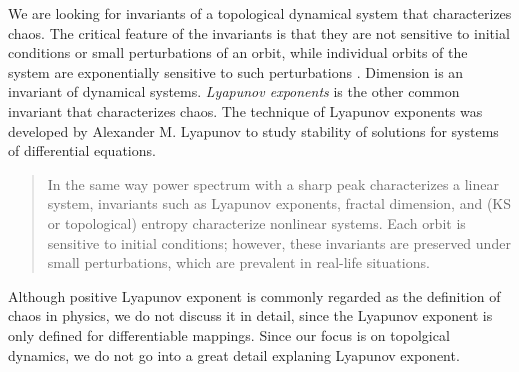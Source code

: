 \documentclass[10pt,twoside,draft]{book}
\begin{document}
We are looking for invariants of a topological dynamical system that characterizes chaos.
The critical feature of the invariants is that they are not sensitive to initial conditions or small perturbations of an orbit, while individual orbits of the system are exponentially sensitive to such perturbations \citep{abarbanel}. %
Dimension is an invariant of dynamical systems.
\textit{Lyapunov exponents} is the other common invariant that characterizes chaos.
The technique of Lyapunov exponents was developed by Alexander M. Lyapunov to study stability of solutions for systems of differential equations.
\begin{quote}
  In the same way power spectrum with a sharp peak characterizes a linear system, invariants such as Lyapunov exponents, fractal dimension, and (KS or topological) entropy characterize nonlinear systems.
  Each orbit is sensitive to initial conditions; however, these invariants are preserved under small perturbations, which are prevalent in real-life situations.
\end{quote}
Although positive Lyapunov exponent is commonly regarded as the definition of chaos \citep{kantz-schreiber} in physics, we do not discuss it in detail, since the Lyapunov exponent is only defined for differentiable mappings.
Since our focus is on topolgical dynamics, we do not go into a great detail explaning Lyapunov exponent.
\end{document}
